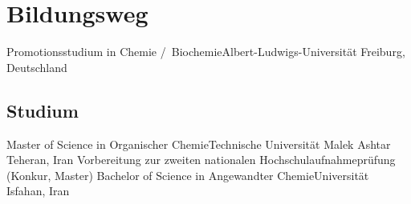 

\section{Bildungsweg}

 {Promotionsstudium in Chemie \slash  ~Biochemie}{Albert-Ludwigs-Universität Freiburg, Deutschland}{}{}{}







\subsection{Studium}
 {Master of Science in Organischer Chemie}{Technische Universität Malek Ashtar Teheran, Iran}{}{}{}
 {Vorbereitung zur zweiten nationalen Hochschulaufnahmeprüfung (Konkur, Master)}{}{}{}{}
 {Bachelor of Science in Angewandter Chemie}{Universität Isfahan, Iran}{}{}{}

